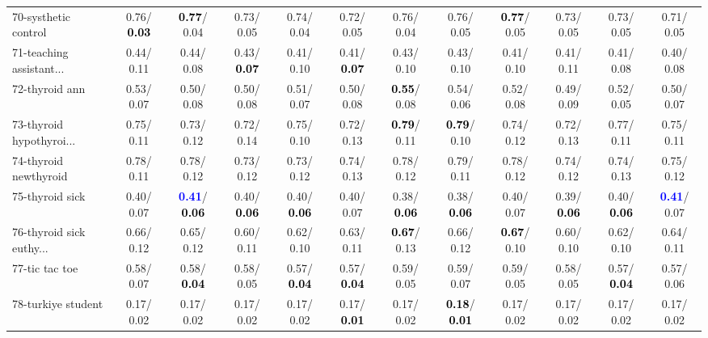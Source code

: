 \begin{table}[h]
\begin{center}
{\begin{tabular}{lc|c|c|c|c|c|c|c|c|c|c}
70-systhetic control &   0.76/\textcolor{black}{\textbf{  0.03}} & \textcolor{black}{\textbf{  0.77}}/  0.04 &   0.73/  0.05 &   0.74/  0.04 &   0.72/  0.05 &   0.76/  0.04 &   0.76/  0.05 & \textcolor{black}{\textbf{  0.77}}/  0.05 &   0.73/  0.05 &   0.73/  0.05 &   0.71/  0.05 \\
71-teaching assistant... &   0.44/  0.11 &   0.44/  0.08 &   0.43/\textcolor{black}{\textbf{  0.07}} &   0.41/  0.10 &   0.41/\textcolor{black}{\textbf{  0.07}} &   0.43/  0.10 &   0.43/  0.10 &   0.41/  0.10 &   0.41/  0.11 &   0.41/  0.08 &   0.40/  0.08 \\ \hline
72-thyroid ann &   0.53/  0.07 &   0.50/  0.08 &   0.50/  0.08 &   0.51/  0.07 &   0.50/  0.08 & \textcolor{black}{\textbf{  0.55}}/  0.08 &   0.54/  0.06 &   0.52/  0.08 &   0.49/  0.09 &   0.52/  0.05 &   0.50/  0.07 \\
73-thyroid hypothyroi... &   0.75/  0.11 &   0.73/  0.12 &   0.72/  0.14 &   0.75/  0.10 &   0.72/  0.13 & \textcolor{black}{\textbf{  0.79}}/  0.11 & \textcolor{black}{\textbf{  0.79}}/  0.10 &   0.74/  0.12 &   0.72/  0.13 &   0.77/  0.11 &   0.75/  0.11 \\
74-thyroid newthyroid &   0.78/  0.11 &   0.78/  0.12 &   0.73/  0.12 &   0.73/  0.12 &   0.74/  0.13 &   0.78/  0.12 &   0.79/  0.11 &   0.78/  0.12 &   0.74/  0.12 &   0.74/  0.13 &   0.75/  0.12 \\
75-thyroid sick &   0.40/  0.07 & \textcolor{blue}{\textbf{  0.41}}/\textcolor{black}{\textbf{  0.06}} &   0.40/\textcolor{black}{\textbf{  0.06}} &   0.40/\textcolor{black}{\textbf{  0.06}} &   0.40/  0.07 &   0.38/\textcolor{black}{\textbf{  0.06}} &   0.38/\textcolor{black}{\textbf{  0.06}} &   0.40/  0.07 &   0.39/\textcolor{black}{\textbf{  0.06}} &   0.40/\textcolor{black}{\textbf{  0.06}} & \textcolor{blue}{\textbf{  0.41}}/  0.07 \\
76-thyroid sick euthy... &   0.66/  0.12 &   0.65/  0.12 &   0.60/  0.11 &   0.62/  0.10 &   0.63/  0.11 & \textcolor{black}{\textbf{  0.67}}/  0.13 &   0.66/  0.12 & \textcolor{black}{\textbf{  0.67}}/  0.10 &   0.60/  0.10 &   0.62/  0.10 &   0.64/  0.11 \\
77-tic tac toe &   0.58/  0.07 &   0.58/\textcolor{black}{\textbf{  0.04}} &   0.58/  0.05 &   0.57/\textcolor{black}{\textbf{  0.04}} &   0.57/\textcolor{black}{\textbf{  0.04}} &   0.59/  0.05 &   0.59/  0.07 &   0.59/  0.05 &   0.58/  0.05 &   0.57/\textcolor{black}{\textbf{  0.04}} &   0.57/  0.06 \\
78-turkiye student &   0.17/  0.02 &   0.17/  0.02 &   0.17/  0.02 &   0.17/  0.02 &   0.17/\textcolor{black}{\textbf{  0.01}} &   0.17/  0.02 & \textcolor{black}{\textbf{  0.18}}/\textcolor{black}{\textbf{  0.01}} &   0.17/  0.02 &   0.17/  0.02 &   0.17/  0.02 &   0.17/  0.02 \\ \hline

\end{tabular}}
\end{center}
\end{table}
